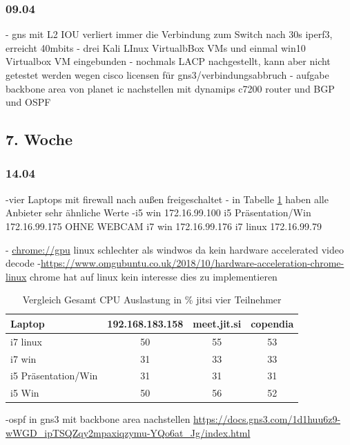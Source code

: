 \documentclass[english,runningheads,a4paper]{llncs}[2018/03/10]
\begin{document}
\subsubsection{09.04}
- gns mit L2 IOU verliert immer die Verbindung zum Switch nach 30s iperf3, erreicht 40mbits
- drei Kali LInux VirtualbBox VMs und einmal win10 Virtualbox VM eingebunden
- nochmals LACP nachgestellt, kann aber nicht getestet werden wegen cisco licensen für gns3/verbindungsabbruch
- aufgabe backbone area von planet ic nachstellen mit dynamips c7200 router und BGP und OSPF

\subsection{7. Woche}
\subsubsection{14.04}
-vier Laptops mit firewall nach außen freigeschaltet
- in Tabelle \ref{tab:JitsiVergleich} haben alle Anbieter sehr ähnliche Werte
-i5 win 172.16.99.100 
 i5 Präsentation/Win 172.16.99.175 OHNE WEBCAM
 i7 win 172.16.99.176
 i7 linux 172.16.99.79

- \url{chrome://gpu} linux schlechter als windwos da kein hardware accelerated video decode -\url{https://www.omgubuntu.co.uk/2018/10/hardware-acceleration-chrome-linux} chrome hat auf linux kein interesse dies zu implementieren
 
 \begin{table}
 	\caption{Vergleich Gesamt CPU Auslastung in \% jitsi vier Teilnehmer}
 	\label{tab:JitsiVergleich}
 	\centering
 	\begin{tabular}{lccc}
 		\toprule
 		Laptop & 192.168.183.158& meet.jit.si  & copendia \\
 		\midrule
 		i7 linux &50 &55      & 53     \\
 		i7 win &31 &33      & 33     \\
 		i5 Präsentation/Win &31 &31      & 31     \\
 		i5 Win &50 &56     & 52     \\ 		
 		\bottomrule
 	\end{tabular}
 \end{table}

-ospf in gns3 mit backbone area nachstellen \url{https://docs.gns3.com/1d1huu6z9-wWGD_ipTSQZqy2mpaxiqzymu-YQo6at_Jg/index.html}
\end{document}
